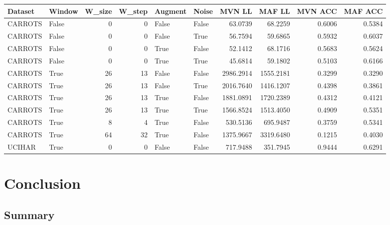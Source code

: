 \documentclass[11pt,titlepage,oneside,openany]{book}
\begin{document}
\begin{table}
\tiny
\begin{tabularx}{\textwidth}{llrrllrrrr}
	\toprule
	Dataset &  Window &  W\_size &  W\_step &  Augment &  Noise &    MVN LL &    MAF LL &  MVN ACC &  MAF ACC \\
	\midrule
	CARROTS &   False &       0 &       0 &    False &  False &   63.0739 &   68.2259 &   0.6006 &   0.5384 \\
	CARROTS &   False &       0 &       0 &    False &   True &   56.7594 &   59.6865 &   0.5932 &   0.6037 \\
	CARROTS &   False &       0 &       0 &     True &  False &   52.1412 &   68.1716 &   0.5683 &   0.5624 \\
	CARROTS &   False &       0 &       0 &     True &   True &   45.6814 &   59.1802 &   0.5103 &   0.6166 \\
	CARROTS &    True &      26 &      13 &    False &  False & 2986.2914 & 1555.2181 &   0.3299 &   0.3290 \\
	CARROTS &    True &      26 &      13 &    False &   True & 2016.7640 & 1416.1207 &   0.4398 &   0.3861 \\
	CARROTS &    True &      26 &      13 &     True &  False & 1881.0891 & 1720.2389 &   0.4312 &   0.4121 \\
	CARROTS &    True &      26 &      13 &     True &   True & 1566.8524 & 1513.4050 &   0.4909 &   0.5351 \\
	CARROTS &    True &       8 &       4 &     True &  False &  530.5136 &  695.9487 &   0.3759 &   0.5341 \\
	CARROTS &    True &      64 &      32 &     True &  False & 1375.9667 & 3319.6480 &   0.1215 &   0.4030 \\
	UCIHAR &    True &       0 &       0 &    False &  False &  717.9488 &  351.7945 &   0.9444 &   0.6291 \\
	\bottomrule
\end{tabularx}
\end{table}




\chapter{Conclusion}
\label{cha:conclusion}


\section{Summary}
\label{sec:sum}
\end{document}
